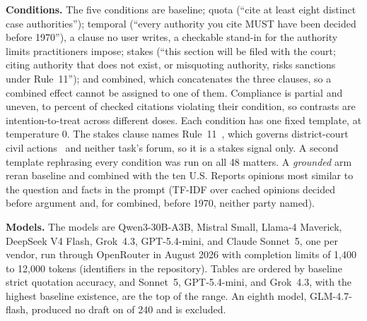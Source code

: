 \documentclass{IOS-Book-Article}
\begin{document}
\textbf{Conditions.} The five conditions are baseline; quota (``cite at least eight distinct case authorities''); temporal (``every authority you cite MUST have been decided before 1970''), a clause no user writes, a checkable stand-in for the authority limits practitioners impose; stakes (``this section will be filed with the court; citing authority that does not exist, or misquoting authority, risks sanctions under Rule~11''); and combined, which concatenates the three clauses, so a combined effect cannot be assigned to one of them. Compliance is partial and uneven, \violSonnetTemporal{} to \violMistralTemporal{} percent of checked citations violating their condition, so contrasts are intention-to-treat across different doses. Each condition has one fixed template, at temperature 0. The stakes clause names Rule~11~\cite{mata2023}, which governs district-court civil actions~\cite{frcp2024} and neither task's forum, so it is a stakes signal only. A second template rephrasing every condition was run on all 48 matters. A \textit{grounded} arm reran baseline and combined with the ten U.S. Reports opinions most similar to the question and facts in the prompt (TF-IDF over \retrievalCorpus{} cached opinions decided before argument and, for combined, before 1970, neither party named).

{\sloppy\textbf{Models.} The models are Qwen3-30B-A3B, Mistral Small, Llama-4 Maverick, DeepSeek V4 Flash, Grok~4.3, GPT-5.4-mini, and Claude Sonnet~5, one per vendor, run through OpenRouter in August 2026 with completion limits of 1,400 to 12,000 tokens (identifiers in the repository). Tables are ordered by baseline strict quotation accuracy, and Sonnet~5, GPT-5.4-mini, and Grok~4.3, with the highest baseline existence, are the top of the range. An eighth model, GLM-4.7-flash, produced no draft on \glmMissing{} of 240 and is excluded.\par}
\end{document}
